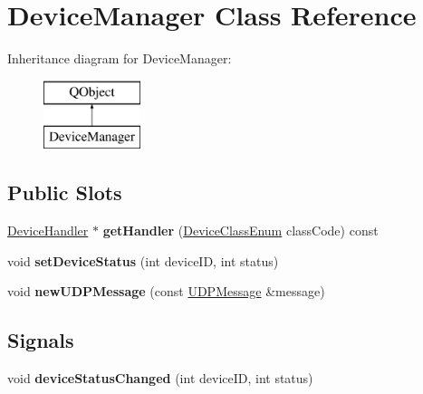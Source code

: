 \hypertarget{class_device_manager}{}\section{Device\+Manager Class Reference}
\label{class_device_manager}
Inheritance diagram for Device\+Manager\+:\begin{figure}[H]
\begin{center}
\leavevmode
\includegraphics[height=2.000000cm]{class_device_manager}
\end{center}
\end{figure}
\subsection*{Public Slots}
\begin{DoxyCompactItemize}
\item 
\mbox{\label{class_device_manager_a693a3a80d7cefeaabbc29fd8695f9e1a}} 
\hyperlink{class_device_handler}{Device\+Handler} $\ast$ {\bfseries get\+Handler} (\hyperlink{_global_defs_8h_ad17679fac69973be9b3a2787a60d7722}{Device\+Class\+Enum} class\+Code) const
\item 
\mbox{\label{class_device_manager_a037575d38c8aa473d57de2950e0daa18}} 
void {\bfseries set\+Device\+Status} (int device\+ID, int status)
\item 
\mbox{\label{class_device_manager_aa231eea3b24b3418482506be4b7d02ef}} 
void {\bfseries new\+U\+D\+P\+Message} (const \hyperlink{class_u_d_p_message}{U\+D\+P\+Message} \&message)
\end{DoxyCompactItemize}
\subsection*{Signals}
\begin{DoxyCompactItemize}
\item 
\mbox{\label{class_device_manager_aa96a714f5d7b0a43c5b37622df5f4800}} 
void {\bfseries device\+Status\+Changed} (int device\+ID, int status)
\end{DoxyCompactItemize}
